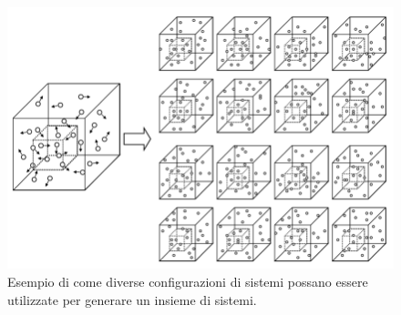 \documentclass[oneside]{amsbook}
\numberwithin{section}{chapter}
\numberwithin{equation}{section}
\numberwithin{figure}{section}
\begin{document}
\begin{figure}
\centering
\caption{Esempio di come diverse configurazioni di sistemi possano essere utilizzate per generare un insieme di sistemi.}\label{Arcamadonna}
\includegraphics[scale=0.3]{ensamble_gen}
\end{figure}
\end{document}
